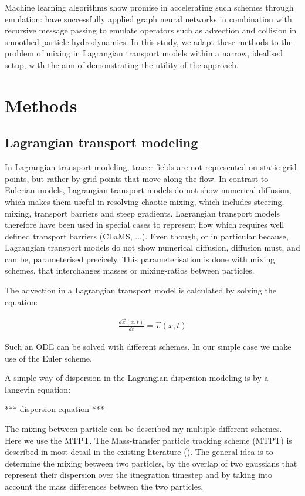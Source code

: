 \documentclass[twocolumn, switch]{article} %
\begin{document}
Machine learning algorithms show promise in accelerating such schemes through emulation:\citet{Li2022} have successfully applied graph neural networks in combination with recursive message passing to emulate operators such as advection and collision in smoothed-particle hydrodynamics. In this study, we adapt these methods to the problem of mixing in Lagrangian transport models within a narrow, idealised setup, with the aim of demonstrating the utility of the approach.

\section{Methods}

\subsection{Lagrangian transport modeling}

In Lagrangian transport modeling, tracer fields are not represented on static grid points, but rather by grid points that move along the flow. In contrast to Eulerian models, Lagrangian transport models do not show numerical diffusion, which makes them useful in resolving chaotic mixing, which includes steering, mixing, transport barriers and steep gradients. Lagrangian transport models therefore have been used in special cases to represent flow which requires well defined transport barriers (CLaMS, ...).  Even though, or in particular because, Lagrangian transport models do not show numerical diffusion, diffusion must, and can be, parameterised precicely. This parameterisation is done with mixing schemes, that interchanges masses or mixing-ratios between particles. 

The advection in a Lagrangian transport model is calculated by solving the equation:

\begin{align}
\frac{d\vec{x}(x,t)}{dt}=\vec{v}(x,t)
\end{align}

Such an ODE can be solved with different schemes. In our simple case we make use of the Euler scheme.

A simple way of dispersion in the Lagrangian dispersion modeling is by a langevin equation:

*** dispersion equation ***

The mixing between particle can be described my multiple different schemes. Here we use the MTPT. The Mass-transfer particle tracking scheme (MTPT) is described in most detail in the existing literature (\citep{Benson2008,Benson2016,Benson2019, Benson2024}). The general idea is to determine the mixing between two particles, by the overlap of two gaussians that represent their dispersion over the itnegration timestep and by taking into account the mass differences between the two particles.
\end{document}
